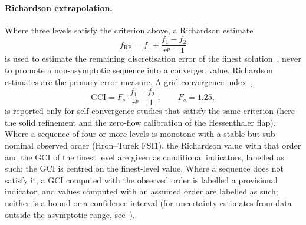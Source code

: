 \paragraph{Richardson extrapolation.}
Where three levels satisfy the criterion above, a Richardson estimate
\begin{equation}
	f_\mathrm{RE} = f_1 + \frac{f_1 - f_2}{r^{p} - 1}
	\label{eq:richardson}
\end{equation}
is used to estimate the remaining discretisation error of the finest solution~\citep{Richardson1911, Roache1998}, never to promote a non-asymptotic sequence into a converged value.
Richardson estimates are the primary error measure.
A grid-convergence index~\citep{Roache1994, Roache1998, Celik2008},
\begin{equation}
	\mathrm{GCI} = F_s\,\frac{|f_1 - f_2|}{r^{p} - 1}, \qquad F_s = 1.25,
	\label{eq:gci}
\end{equation}
is reported only for self-convergence studies that satisfy the same criterion (here the solid refinement and the zero-flow calibration of the Hessenthaler flap). Where a sequence of four or more levels is monotone with a stable but sub-nominal observed order (Hron--Turek FSI1), the Richardson value with that order and the GCI of the finest level are given as conditional indicators, labelled as such; the GCI is centred on the finest-level value.
Where a sequence does not satisfy it, a GCI computed with the observed order is labelled a provisional indicator, and values computed with an assumed order are labelled as such; neither is a bound or a confidence interval (for uncertainty estimates from data outside the asymptotic range, see~\citet{Eca2014}).

